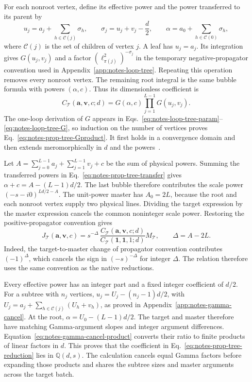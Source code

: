 For each nonroot vertex, define its effective power and the power transferred to its parent by
\begin{equation}
 u_j=a_j+\sum_{h\in\mathcal C(j)}\sigma_h,
 \qquad \sigma_j=u_j+v_j-\frac d2,
 \qquad \alpha=a_0+\sum_{h\in\mathcal C(0)}\sigma_h,
 \label{eq:notes-prop-tree-transfer}
\end{equation}
where $\mathcal C(j)$ is the set of children of vertex $j$. A leaf has $u_j=a_j$. Its integration gives $G(u_j,v_j)$ and a factor $(\ell_{\pi(j)}^2)^{-\sigma_j}$ in the temporary negative-propagator convention used in Appendix~\ref{app:notes-loop-tree}. Repeating this operation removes every nonroot vertex. The remaining root integral is the same bubble formula with powers $(\alpha,c)$. Thus its dimensionless coefficient is
\begin{equation}
 C_{\mathcal T}(\boldsymbol a,\boldsymbol v,c;d)
 =G(\alpha,c)\prod_{j=1}^{L-1}G(u_j,v_j).
 \label{eq:notes-prop-tree-Gproduct}
\end{equation}
The one-loop derivation of $G$ appears in Eqs.~\eqref{eq:notes-loop-tree-param}--\eqref{eq:notes-loop-tree-G}, so induction on the number of vertices proves Eq.~\eqref{eq:notes-prop-tree-Gproduct}. It first holds in a convergence domain and then extends meromorphically in $d$ and the powers~\cite{Weinzierl2022}.

Let $A=\sum_{j=0}^{L-1}a_j+\sum_{j=1}^{L-1}v_j+c$ be the sum of physical powers. Summing the transferred powers in Eq.~\eqref{eq:notes-prop-tree-transfer} gives $\alpha+c=A-(L-1)d/2$. The last bubble therefore contributes the scale power $(-s-i0)^{Ld/2-A}$. The unit-power master has $A_0=2L$, because the root and each nonroot vertex supply two physical lines. Dividing the target expression by the master expression cancels the common noninteger scale power. Restoring the positive-propagator convention gives
\begin{equation}
 J_{\mathcal T}(\boldsymbol a,\boldsymbol v,c)
 =s^{-\Delta}\,
 \frac{C_{\mathcal T}(\boldsymbol a,\boldsymbol v,c;d)}
 {C_{\mathcal T}(\boldsymbol 1,\boldsymbol 1,1;d)}
 M_{\mathcal T},
 \qquad \Delta=A-2L.
 \label{eq:notes-prop-tree-reduction}
\end{equation}
Indeed, the target-to-master change of propagator convention contributes $(-1)^\Delta$, which cancels the sign in $(-s)^{-\Delta}$ for integer $\Delta$. The relation therefore uses the same convention as the native reductions.

Every effective power has an integer part and a fixed integer coefficient of $d/2$. For a subtree with $n_j$ vertices, $u_j=U_j-(n_j-1)d/2$, with $U_j=a_j+\sum_{h\in\mathcal C(j)}(U_h+v_h)$, as proved in Appendix~\ref{app:notes-gamma-cancel}. At the root, $\alpha=U_0-(L-1)d/2$. The target and master therefore have matching Gamma-argument slopes and integer argument differences. Equation~\eqref{eq:notes-gamma-cancel-product} converts their ratio to finite products of linear factors in $d$. This proves that the coefficient in Eq.~\eqref{eq:notes-prop-tree-reduction} lies in $\mathbb Q(d,s)$. The calculation cancels equal Gamma factors before expanding those products and shares the subtree sizes and master arguments across the target batch.


